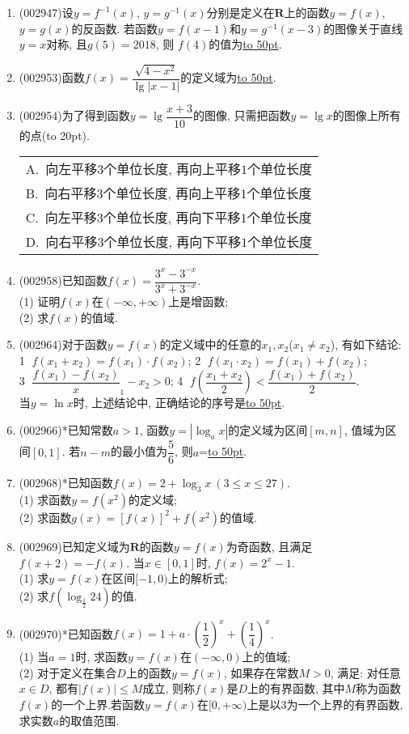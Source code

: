 \documentclass[10pt,a4paper]{article}
\newcommand{\blank}[1]{\underline{\hbox to #1pt{}}}
\newcommand{\bracket}[1]{(\hbox to #1pt{})}
\newcommand{\onech}[4]{\par\begin{tabular}{p{.9\textwidth}}
A.~#1\\
B.~#2\\
C.~#3\\
D.~#4
\end{tabular}}
\begin{document}
\begin{enumerate}[1.]
\item {\tiny (002947)}设$y=f^{-1}(x)$, $y=g^{-1}(x)$分别是定义在$\mathbf{R}$上的函数$y=f(x)$, $y=g(x)$的反函数. 若函数$y=f(x-1)$和$y=g^{-1}(x-3)$的图像关于直线$y=x$对称, 且$g(5)=2018$, 则 $f(4)$的值为\blank{50}.
\item {\tiny (002953)}函数$f(x)=\dfrac{\sqrt{4-x^2}}{\lg |x-1|}$的定义域为\blank{50}.
\item {\tiny (002954)}为了得到函数$y=\lg\dfrac{x+3}{10}$的图像, 只需把函数$y=\lg x$的图像上所有的点\bracket{20}.
\onech{向左平移$3$个单位长度, 再向上平移$1$个单位长度}{向右平移$3$个单位长度, 再向上平移$1$个单位长度}{向左平移$3$个单位长度, 再向下平移$1$个单位长度}{向右平移$3$个单位长度, 再向下平移$1$个单位长度}
\item {\tiny (002958)}已知函数$f(x)=\dfrac{3^x-3^{-x}}{3^x+3^{-x}}$.\\
(1) 证明$f(x)$在$(-\infty,+\infty)$上是增函数;\\
(2) 求$f(x)$的值域.
\item {\tiny (002964)}对于函数$y=f(x)$的定义域中的任意的$x_1,x_2$($x_1\ne x_2$), 有如下结论:\\
\textcircled{1} $f(x_1+x_2)=f(x_1)\cdot f(x_2)$; \textcircled{2} $f(x_1\cdot x_2)=f(x_1)+f(x_2)$;\\ \textcircled{3} $\dfrac{f(x_1)-f(x_2)}x_1-x_2>0$; \textcircled{4} $f(\dfrac{x_1+x_2}2)<\dfrac{f(x_1)+f(x_2)}2$. 
\\当$y=\ln x$时, 上述结论中, 正确结论的序号是\blank{50}.
\item {\tiny (002966)}*已知常数$a>1$, 函数$y=|\log_ax|$的定义域为区间$[m,n]$, 值域为区间$[0,1]$. 若$n-m$的最小值为$\dfrac 56$, 则$a$=\blank{50}.
\item {\tiny (002968)}*已知函数$f(x)=2+\log_3 x\ (3\le x\le 27)$.\\
(1) 求函数$y=f(x^2)$的定义域;\\
(2) 求函数$g(x)={[f(x)]}^2+f(x^2)$的值域.
\item {\tiny (002969)}已知定义域为$\mathbf{R}$的函数$y=f(x)$为奇函数, 且满足$f(x+2)=-f(x)$. 当$x\in [0,1]$时, $f(x)=2^x-1$.\\
(1) 求$y=f(x)$在区间$[-1,0)$上的解析式;\\
(2) 求$f(\log_{\frac 12}24)$的值.
\item {\tiny (002970)}*已知函数$f(x)=1+a\cdot (\dfrac 12)^x+(\dfrac 14)^x$.\\
(1) 当$a=1$时, 求函数$y=f(x)$在$(-\infty,0)$上的值域;\\
(2) 对于定义在集合$D$上的函数$y=f(x)$, 如果存在常数$M>0$, 满足: 对任意$x\in D$, 都有$|f(x)|\le M$成立, 则称$f(x)$是$D$上的有界函数, 其中$M$称为函数$f(x)$的一个上界.若函数$y=f(x)$在$[0,+\infty)$上是以$3$为一个上界的有界函数, 求实数$a$的取值范围.

\end{enumerate}
\end{document}

